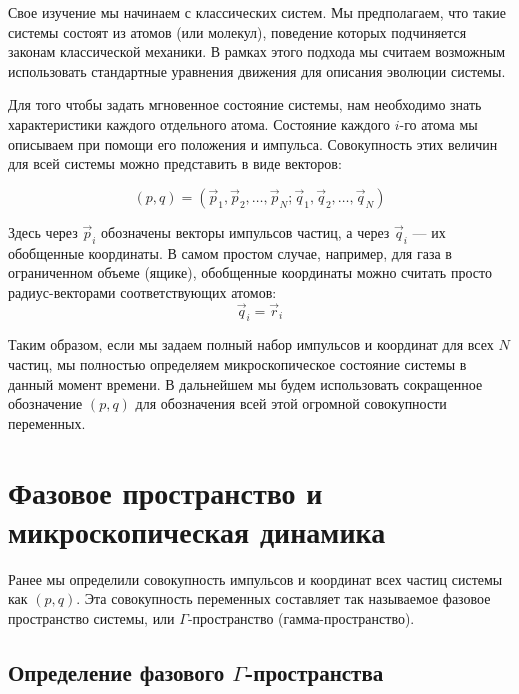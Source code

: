 \documentclass[../general/general]{subfiles}
\begin{document}
Свое изучение мы начинаем с классических систем. Мы предполагаем, что такие системы состоят из атомов (или молекул), поведение которых подчиняется законам классической механики. В рамках этого подхода мы считаем возможным использовать стандартные уравнения движения для описания эволюции системы.

Для того чтобы задать мгновенное состояние системы, нам необходимо знать характеристики каждого отдельного атома. Состояние каждого $i$-го атома мы описываем при помощи его положения и импульса. Совокупность этих величин для всей системы можно представить в виде векторов:

\begin{equation}
    (p, q) = (\vec{p}_1, \vec{p}_2, \dots, \vec{p}_N; \vec{q}_1, \vec{q}_2, \dots, \vec{q}_N)
\end{equation}

Здесь через $\vec{p}_i$ обозначены векторы импульсов частиц, а через $\vec{q}_i$ — их обобщенные координаты. В самом простом случае, например, для газа в ограниченном объеме (ящике), обобщенные координаты можно считать просто радиус-векторами соответствующих атомов:
\begin{equation}
    \vec{q}_i = \vec{r}_i
\end{equation}

Таким образом, если мы задаем полный набор импульсов и координат для всех $N$ частиц, мы полностью определяем микроскопическое состояние системы в данный момент времени. В дальнейшем мы будем использовать сокращенное обозначение $(p, q)$ для обозначения всей этой огромной совокупности переменных.


\section{Фазовое пространство и микроскопическая динамика}

Ранее мы определили совокупность импульсов и координат всех частиц системы как $(p, q)$. Эта совокупность переменных составляет так называемое фазовое пространство системы, или $\Gamma$-пространство (гамма-пространство).

\subsection{Определение фазового $\Gamma$-пространства}
\end{document}
